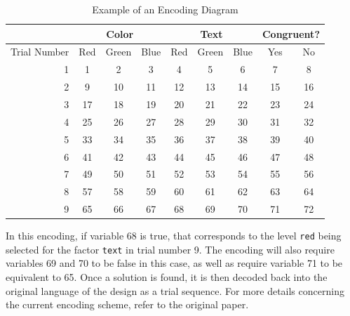 \begin{table}[htb]
  \centering
  \caption{Example of an Encoding Diagram}
\begin{tabular}{|r|c|c|c|c|c|c|c|c|}
\hline
\multicolumn{1}{|l|}{}             & \multicolumn{3}{c|}{Color} & \multicolumn{3}{c|}{Text} & \multicolumn{2}{c|}{Congruent?} \\ \hline
\multicolumn{1}{|l|}{Trial Number} & Red    & Green    & Blue   & Red    & Green   & Blue   & Yes             & No            \\ \hline
1                                  & 1      & 2        & 3      & 4      & 5       & 6      & 7               & 8             \\ \hline
2                                  & 9      & 10       & 11     & 12     & 13      & 14     & 15              & 16            \\ \hline
3                                  & 17     & 18       & 19     & 20     & 21      & 22     & 23              & 24            \\ \hline
4                                  & 25     & 26       & 27     & 28     & 29      & 30     & 31              & 32            \\ \hline
5                                  & 33     & 34       & 35     & 36     & 37      & 38     & 39              & 40            \\ \hline
6                                  & 41     & 42       & 43     & 44     & 45      & 46     & 47              & 48            \\ \hline
7                                  & 49     & 50       & 51     & 52     & 53      & 54     & 55              & 56            \\ \hline
8                                  & 57     & 58       & 59     & 60     & 61      & 62     & 63              & 64            \\ \hline
9                                  & 65     & 66       & 67     & 68     & 69      & 70     & 71              & 72            \\ \hline
\end{tabular}
\label{tab:encoding_diagram}
\end{table}

In this encoding, if variable 68 is true, that corresponds to the level \texttt{red} being selected for the factor \texttt{text} in trial number 9. The encoding will also require variables 69 and 70 to be false in this case, as well as require variable 71 to be equivalent to 65. Once a solution is found, it is then decoded back into the original language of the design as a trial sequence. For more details concerning the current encoding scheme, refer to the original paper.

